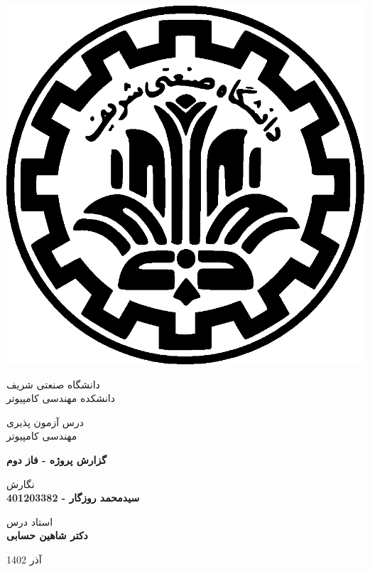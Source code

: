 \begin{center}
	\vspace{5cm}
	
	
	\includegraphics[scale=0.2]{front/pictures/logo.eps}
	
	\vspace{-0.2cm}
	دانشگاه صنعتی شریف \\[-0.3em]
	دانشکده مهندسی کامپیوتر
	
	\begin{large}
		\vspace{0.5cm}
		
		درس آزمون پذیری \\[-0.3em]
		مهندسی کامپیوتر
		
	\end{large}
	
	\vspace{2cm}
	
	{\LARGE\textbf{گزارش پروژه - فاز دوم}}
	
	\vspace{2cm}
	
	{نگارش}\\[.5em]
	{\large\textbf{سیدمحمد روزگار - 401203382}}
	
	\vspace{0.7cm}
	
	{استاد درس}\\[.5em]
	{\large\textbf{دکتر شاهین حسابی}}
	
	\vspace{1.3cm}
	
	آذر 1402
	
\end{center}

\newpage